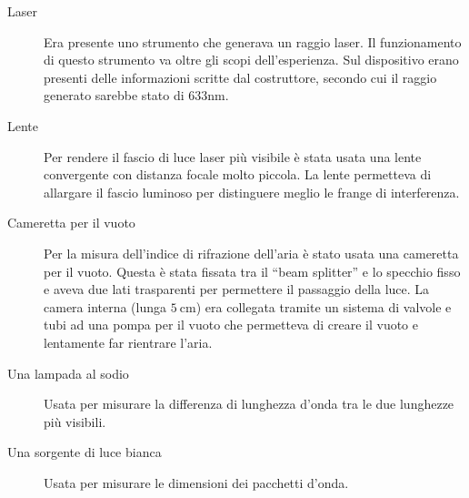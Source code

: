 \documentclass[a4paper,11pt]{article}
\newcommand{\virgolette}[1]{``#1''}
\begin{document}
\begin{description}
	
	\item[Laser] Era presente uno strumento che generava un raggio laser. Il funzionamento di questo strumento va oltre gli scopi dell'esperienza. Sul dispositivo erano presenti delle informazioni scritte dal costruttore, secondo cui il raggio generato sarebbe stato di $ 633\si{\nano\meter} $.
	\item[Lente] Per rendere il fascio di luce laser più visibile è stata usata una lente convergente con distanza focale molto piccola. La lente permetteva di allargare il fascio luminoso per distinguere meglio le frange di interferenza.
	\item[Cameretta per il vuoto] Per la misura dell'indice di rifrazione dell'aria è stato usata una cameretta per il vuoto. Questa è stata fissata tra il \virgolette{beam splitter} e lo specchio fisso e aveva due lati trasparenti per permettere il passaggio della luce. La camera interna (lunga $ \SI{5}{\centi\meter}$) era collegata tramite un sistema di valvole e tubi ad una pompa per il vuoto che permetteva di creare il vuoto e lentamente far rientrare l'aria.
	\item[Una lampada al sodio] Usata per misurare la differenza di lunghezza d'onda tra le due lunghezze più visibili.
	\item[Una sorgente di luce bianca] Usata per misurare le dimensioni dei pacchetti d'onda.
\end{description}
\end{document}
